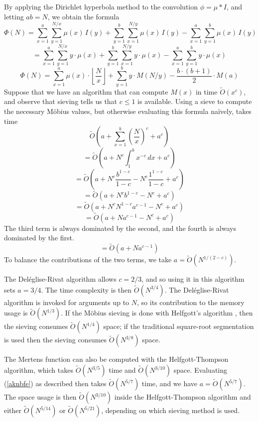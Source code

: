 \documentclass[12pt]{article}
\newcommand{\eqn}[1]{\begin{displaymath} #1 \end{displaymath}}
\newcommand{\neqn}[1]{\begin{equation} #1 \end{equation}}
\newcommand{\floor}[1]{{\left\lfloor #1 \right\rfloor}}
\newcommand{\integral}[4]{\displaystyle\int_{#3}^{#4} \! #1 \, d#2}
\newcommand{\floordiv}[2]{\floor{\frac{#1}{#2}}}
\begin{document}
By applying the Dirichlet hyperbola method to the convolution $\phi = \mu * I$, and letting $ab=N$, we obtain the formula
\eqn{\Phi(N) = \sum_{x=1}^{a}\sum_{y=1}^{N/x} \mu(x) \, I(y) + \sum_{y=1}^{b}\sum_{x=1}^{N/y} \mu(x) \, I(y) - \sum_{x=1}^{a}\sum_{y=1}^{b} \mu(x) \, I(y)}
\eqn{ = \sum_{x=1}^{a}\sum_{y=1}^{N/x} y \cdot \mu(x) + \sum_{y=1}^{b}\sum_{x=1}^{N/y} y \cdot \mu(x) - \sum_{x=1}^{a}\sum_{y=1}^{b} y \cdot \mu(x)}
\neqn{\Phi(N) = \sum_{x=1}^{a} \mu(x) \cdot \floordiv{N}{x} + \sum_{y=1}^{b} y \cdot M(N/y) - \frac{b \cdot (b+1)}{2} \cdot M(a) \label{aknbfe}}
Suppose that we have an algorithm that can compute $M(x)$ in time $\widetilde{O}(x^c)$, and observe that sieving tells us that $c\leq1$ is available.  Using a sieve to compute the necessary M\"obius values, but otherwise evaluating this formula na\"{i}vely, takes time
\eqn{\widetilde{O}\left( a + \sum_{x=1}^b \left(\frac{N}{x}\right)^c + a^c \right)}
\eqn{=\widetilde{O}\left( a + N^c \integral{x^{-c}}{x}{1}{b} + a^c \right)}
\eqn{=\widetilde{O}\left( a + N^c\frac{b^{1-c}}{1-c} - N^c\frac{1^{1-c}}{1-c} + a^c \right)}
\eqn{=\widetilde{O}\left( a + N^c b^{1-c} - N^c + a^c \right)}
\eqn{=\widetilde{O}\left( a + N^c N^{1-c} a^{c-1} - N^c + a^c \right)}
\eqn{=\widetilde{O}\left( a + N a^{c-1} - N^c + a^c \right)}
The third term is always dominated by the second, and the fourth is always dominated by the first.
\eqn{=\widetilde{O}\left( a + N a^{c-1} \right)}
To balance the contributions of the two terms, we take $a = \widetilde{O}(N^{1/(2-c)})$.

The Del\'{e}glise-Rivat algorithm \cite{DR1996} allows $c=2/3$, and so using it in this algorithm sets $a=3/4$.  The time complexity is then $\widetilde{O}(N^{3/4})$. 
 The Del\'{e}glise-Rivat algorithm is invoked for arguments up to $N$, so its contribution to the memory usage is $\widetilde{O}(N^{1/3})$.  If the M\"{o}bius sieving is done with Helfgott's algorithm \cite{Helfgott2020}, then the sieving consumes $\widetilde{O}(N^{1/4})$ space; if the traditional square-root segmentation is used then the sieving consumes $\widetilde{O}(N^{3/8})$ space.

The Mertens function can also be computed with the Helfgott-Thompson algorithm, which takes $\widetilde{O}(N^{3/5})$ time and $\widetilde{O}(N^{3/10})$ space.  Evaluating (\ref{aknbfe}) as described then takes $\widetilde{O}(N^{5/7})$ time, and we have $a = \widetilde{O}(N^{5/7})$.  The space usage is then $\widetilde{O}(N^{3/10})$ inside the Helfgott-Thompson algorithm and either $\widetilde{O}(N^{5/14})$ or $\widetilde{O}(N^{5/21})$, depending on which sieving method is used.
\end{document}
